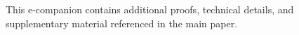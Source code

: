 \documentclass[poms,final,blindrev]{poms1_V1} %
\begin{document}



 \let\oldbibliography\thebibliography
 \renewcommand{\thebibliography}[1]{%
    \oldbibliography{#1}%
    \baselineskip14pt %
    \setlength{\itemsep}{10pt}%
 }


\ECSwitch %


\noindent This e-companion contains additional proofs, technical details, and supplementary material referenced in the main paper.

% 


 
% 
% 

\end{document}
